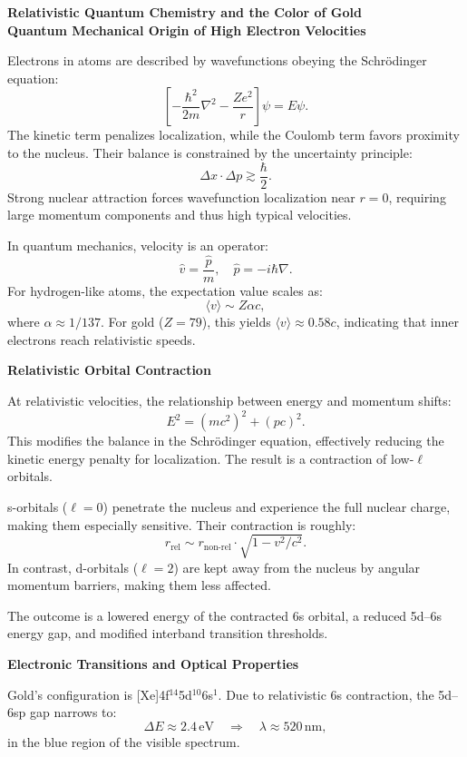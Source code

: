 \begin{technical}
    \sloppy
    {\Large\textbf{Relativistic Quantum Chemistry and the Color of Gold}}\\[0.7em]
    
    \noindent\textbf{Quantum Mechanical Origin of High Electron Velocities}
    
    Electrons in atoms are described by wavefunctions obeying the Schrödinger equation:
    \[
    \left[ -\frac{\hbar^2}{2m} \nabla^2 - \frac{Ze^2}{r} \right] \psi = E \psi.
    \]
    The kinetic term penalizes localization, while the Coulomb term favors proximity to the nucleus. Their balance is constrained by the uncertainty principle:
    \[
    \Delta x \cdot \Delta p \gtrsim \frac{\hbar}{2}.
    \]
    Strong nuclear attraction forces wavefunction localization near $r = 0$, requiring large momentum components and thus high typical velocities.
    
    In quantum mechanics, velocity is an operator:
    \[
    \hat{v} = \frac{\hat{p}}{m}, \quad \hat{p} = -i\hbar \nabla.
    \]
    For hydrogen-like atoms, the expectation value scales as:
    \[
    \langle v \rangle \sim Z\alpha c,
    \]
    where \( \alpha \approx 1/137 \). For gold (\(Z = 79\)), this yields \(\langle v \rangle \approx 0.58c\), indicating that inner electrons reach relativistic speeds.
    
    \noindent\textbf{Relativistic Orbital Contraction}
    
    At relativistic velocities, the relationship between energy and momentum shifts:
    \[
    E^2 = (m c^2)^2 + (pc)^2.
    \]
    This modifies the balance in the Schrödinger equation, effectively reducing the kinetic energy penalty for localization. The result is a contraction of low-$\ell$ orbitals.
    
    s-orbitals (\(\ell = 0\)) penetrate the nucleus and experience the full nuclear charge, making them especially sensitive. Their contraction is roughly:
    \[
    r_\text{rel} \sim r_\text{non-rel} \cdot \sqrt{1 - v^2/c^2}.
    \]
    In contrast, d-orbitals (\(\ell = 2\)) are kept away from the nucleus by angular momentum barriers, making them less affected.
    
    The outcome is a lowered energy of the contracted 6s orbital, a reduced 5d–6s energy gap, and modified interband transition thresholds.
    
    \noindent\textbf{Electronic Transitions and Optical Properties}
    
    Gold’s configuration is [Xe]4f$^{14}$5d$^{10}$6s$^1$. Due to relativistic 6s contraction, the 5d–6sp gap narrows to:
    \[
    \Delta E \approx 2.4\,\text{eV} \quad \Rightarrow \quad \lambda \approx 520\,\text{nm},
    \]
    in the blue region of the visible spectrum.
    

\end{technical}
